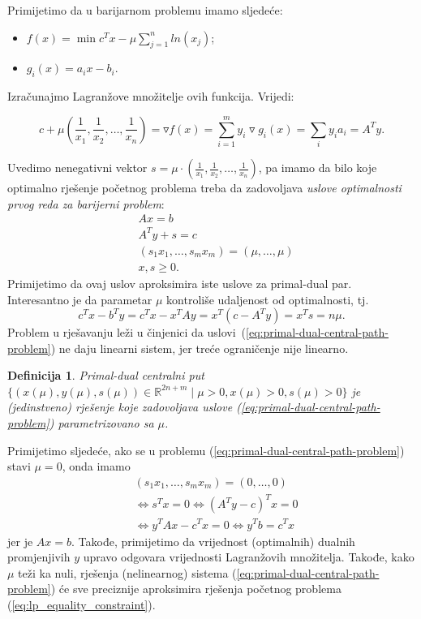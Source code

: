 \documentclass[a4paper, utf8, 11pt, colorlinks]{book}
\newtheorem{definition}{Definicija}
\begin{document}
Primijetimo da u barijarnom problemu imamo sljedeće:
\begin{itemize}
	\item $f(x) = \min c^T x - \mu \sum_{j=1}^n ln(x_j) $;
	\item $g_i(x) = a_i x - b_i$.
\end{itemize}
Izračunajmo Lagranžove množitelje ovih funkcija. Vrijedi:

$$c + \mu (\frac{1}{x_1}, \frac{1}{x_2}, \ldots, \frac{1}{x_n}) = \triangledown f (x) =\sum_{i=1}^m y_i \triangledown g_i(x) = \sum_{i} y_i a_i = A^T y.$$ 

Uvedimo nenegativni vektor $s =\mu \cdot (\frac{1}{x_1}, \frac{1}{x_2}, \ldots, \frac{1}{x_n})$, pa imamo da bilo koje optimalno rješenje početnog problema treba da zadovoljava \emph{uslove optimalnosti prvog reda za barijerni problem}:
\begin{align}
	&A x = b \nonumber \\
	&A^T y + s = c  \nonumber \\
	& (s_1 x_1, \ldots, s_m x_m) = (\mu, \ldots, \mu) \label{eq:primal-dual-central-path-problem} \\
	& x, s \geq 0. \nonumber
\end{align}
Primijetimo da ovaj uslov aproksimira iste uslove za primal-dual par.  
Interesantno je da parametar $\mu$ kontroliše udaljenost od optimalnosti, tj. 
$$ c^T x - b^T y = c^T x - x^T A y = x^T(c- A^Ty ) = x^T s = n \mu.$$
 Problem u rješavanju leži u činjenici da uslovi~(\ref{eq:primal-dual-central-path-problem}) ne daju linearni sistem, jer treće ograničenje  nije linearno.

\begin{definition}
	Primal-dual centralni put $\{(x(\mu), y(\mu), s(\mu)) \in \mathbb{R}^{2n + m} \mid \mu > 0, x(\mu) >0, s(\mu)>0 \}$ je (jedinstveno) rješenje koje zadovoljava uslove (\ref{eq:primal-dual-central-path-problem}) parametrizovano sa $\mu$. 
\end{definition}

Primijetimo sljedeće, ako se u problemu (\ref{eq:primal-dual-central-path-problem}) stavi $\mu = 0$, onda imamo 
\begin{align*}
	&(s_1 x_1, \ldots, s_m x_m) = (0, \ldots, 0) \\
	&\Longleftrightarrow s^T x = 0  \Longleftrightarrow (A^T y - c)^T x = 0 \\
	&\Longleftrightarrow y^T A x - c^T x = 0 \Longleftrightarrow y^T b = c^Tx
\end{align*}
jer je $Ax = b$. Takođe, primijetimo da   vrijednost (optimalnih) dualnih promjenjivih $y$ upravo odgovara vrijednosti Lagranžovih množitelja. Takođe, kako $\mu$ teži ka nuli,  rješenja (nelinearnog) sistema  (\ref{eq:primal-dual-central-path-problem}) će sve preciznije aproksimira rješenja početnog problema (\ref{eq:lp_equality_constraint}). 
\end{document}
